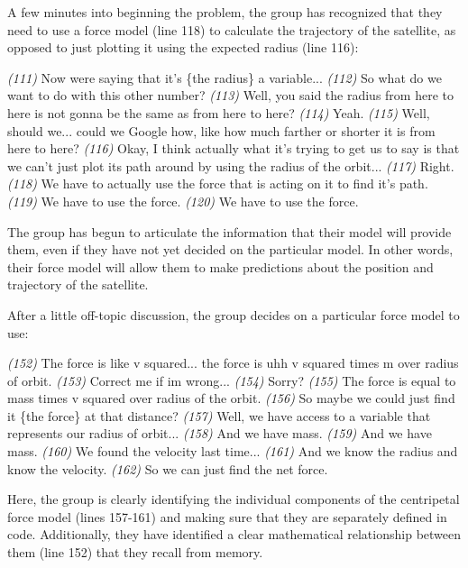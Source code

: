\documentclass{msuphddissertation}
\begin{document}
\begin{doublespace}
A few minutes into beginning the problem, the group has recognized that they need to use a force model (line 118) to calculate the trajectory of the satellite, as opposed to just plotting it using the expected radius (line 116): \begin{description}
\SA \textit{(111)} Now were saying that it’s \{the radius\} a variable...
\SA \textit{(112)} So what do we want to do with this {other} number?
\SB \textit{(113)} Well, you said the radius from here to here is not gonna be the same as from here to here?
\SA \textit{(114)} Yeah.
\SB \textit{(115)} Well, should we... could we Google how, like how much farther or shorter it is from here to here?
\SD \textit{(116)} Okay, I think actually what it's trying to get us to say is that we can't just plot its path around by using the radius of the orbit...
\SA \textit{(117)} Right.
\SD \textit{(118)} We have to actually use the force that is acting on it to find it's path.
\SA \textit{(119)} We have to use the force.
\SD \textit{(120)} We have to use the force.\end{description}  The group has begun to articulate the information that their model will provide them, even if they have not yet decided on the particular model.  In other words, their force model will allow them to make predictions about the position and trajectory of the satellite.

After a little off-topic discussion, the group decides on a particular force model to use: \begin{description}
\SD \textit{(152)} The force is like v squared... the force is uhh v squared times m over radius of orbit.
\SD \textit{(153)} Correct me if im wrong...
\SA \textit{(154)} Sorry?
\SD \textit{(155)} The force is equal to mass times v squared over radius of the orbit.
\SB \textit{(156)} So maybe we could just find it \{the force\} at that distance?
\SD \textit{(157)} Well, we have access to a variable that represents our radius of orbit...
\SB \textit{(158)} And we have mass.
\SD \textit{(159)} And we have mass.
\SC \textit{(160)} We found the velocity last time...
\SB \textit{(161)} And we know the radius and know the velocity.
\SB \textit{(162)} So we can just find the net force.\end{description}  Here, the group is clearly identifying the individual components of the centripetal force model (lines 157-161) and making sure that they are separately defined in code.  Additionally, they have identified a clear mathematical relationship between them (line 152) that they recall from memory.


\end{doublespace}
\end{document}
